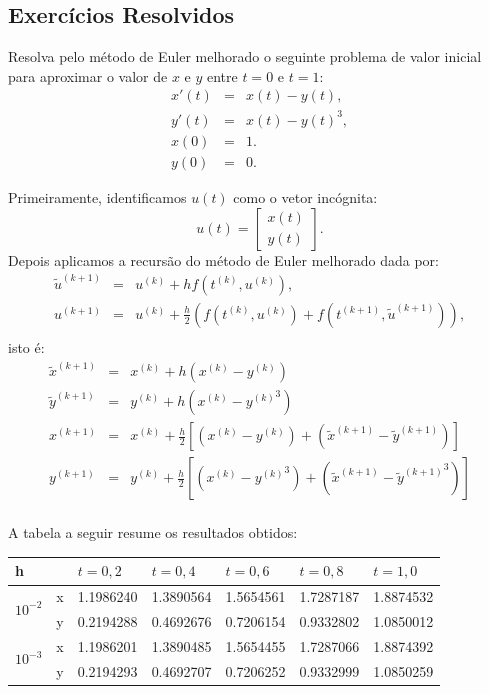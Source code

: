 \subsection*{Exercícios Resolvidos}
\begin{exeresol} Resolva pelo método de Euler melhorado o seguinte problema de valor inicial para aproximar o valor de $x$ e $y$ entre $t=0$ e $t=1$:
\begin{eqnarray}
x'(t)&=&x(t)-y(t),\\
y'(t)&=&x(t)-y(t)^3,\\
x(0)&=&1.\\
y(0)&=&0.
\end{eqnarray}
\end{exeresol}
\begin{resol}
 Primeiramente, identificamos $u(t)$ como o vetor incógnita:
 \begin{equation} u(t)=\left[\begin{array}{c}x(t)\\y(t)\end{array}\right]. \end{equation}
Depois aplicamos a recursão do método de Euler melhorado dada por:
 \begin{eqnarray}
\tilde{u}^{(k+1)}&=&u^{(k)}+hf(t^{(k)},u^{(k)}),\\
u^{(k+1)}&=&u^{(k)}+\frac{h}{2}\left(f(t^{(k)},u^{(k)})+f(t^{(k+1)},\tilde{u}^{(k+1)})\right),\\
\end{eqnarray}
isto é:
 \begin{eqnarray}
\tilde{x}^{(k+1)}&=&x^{(k)}+h\left(x^{(k)}-y^{(k)}\right)\\
\tilde{y}^{(k+1)}&=&y^{(k)}+h\left(x^{(k)}-{y^{(k)}}^3\right)\\
{x}^{(k+1)}&=&x^{(k)}+\frac{h}{2}\left[\left({x}^{(k)}-{y}^{(k)}\right)+\left(\tilde{x}^{(k+1)}-\tilde{y}^{(k+1)}\right)\right]\\
{y}^{(k+1)}&=&y^{(k)}+\frac{h}{2}\left[\left({x}^{(k)}-{{y}^{(k)}}^3\right)+ \left(\tilde{x}^{(k+1)}-\left.{\tilde{y}^{(k+1)}}\right.^3\right)\right]\\
 \end{eqnarray}

 A tabela a seguir resume os resultados obtidos:


 \begin{center}
 \begin{tabular}{|l|l|l|l|l|l|l|}%
\hline
   h&&$t=0,2$&$t=0,4$&$t=0,6$&$t=0,8$&$t=1,0$\\
   \hline
   \multirow{2}{*}{$10^{-2}$} &x  &1.1986240 &1.3890564 &1.5654561 &1.7287187 &1.8874532 \\
			       &y&0.2194288 &0.4692676 &0.7206154 &0.9332802 &1.0850012 \\
   \hline
  \multirow{2}{*}{$10^{-3}$} &x  &1.1986201 &1.3890485 &1.5654455 &1.7287066 &1.8874392\\
			       &y &0.2194293 &0.4692707 &0.7206252 &0.9332999 &1.0850259\\
			       \hline



\end{tabular}
\end{center}
\end{resol}
